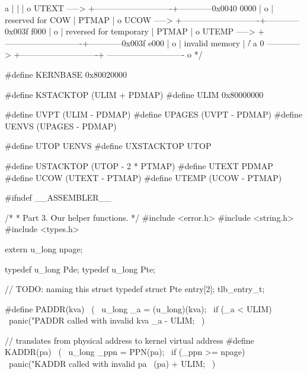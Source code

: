 \begin{CodeBlock}[language=BookC]
 a                      |                            |                           |
 o       UTEXT   -----> +----------------------------+------------0x0040 0000    |
 o                      |      reserved for COW      |     PTMAP                 |
 o       UCOW    -----> +----------------------------+------------0x003f f000    |
 o                      |   reversed for temporary   |     PTMAP                 |
 o       UTEMP   -----> +----------------------------+------------0x003f e000    |
 o                      |       invalid memory       |                          \|/
 a     0 ------------>  +----------------------------+ ----------------------------
 o
*/

#define KERNBASE 0x80020000

#define KSTACKTOP (ULIM + PDMAP)
#define ULIM 0x80000000

#define UVPT (ULIM - PDMAP)
#define UPAGES (UVPT - PDMAP)
#define UENVS (UPAGES - PDMAP)

#define UTOP UENVS
#define UXSTACKTOP UTOP

#define USTACKTOP (UTOP - 2 * PTMAP)
#define UTEXT PDMAP
#define UCOW (UTEXT - PTMAP)
#define UTEMP (UCOW - PTMAP)

#ifndef __ASSEMBLER__

/*
 * Part 3.  Our helper functions.
 */
#include <error.h>
#include <string.h>
#include <types.h>

extern u_long npage;

typedef u_long Pde;
typedef u_long Pte;

// TODO: naming this struct
typedef struct {
    Pte entry[2];
} tlb_entry_t;

#define PADDR(kva)                                                                                 \
    ({                                                                                         \
        u_long _a = (u_long)(kva);                                                         \
        if (_a < ULIM)                                                                     \
            panic("PADDR called with invalid kva %
        _a - ULIM;                                                                         \
    })

// translates from physical address to kernel virtual address
#define KADDR(pa)                                                                                  \
    ({                                                                                         \
        u_long _ppn = PPN(pa);                                                             \
        if (_ppn >= npage) {                                                               \
            panic("KADDR called with invalid pa %
        }                                                                                  \
        (pa) + ULIM;                                                                       \
    })


\end{CodeBlock}
